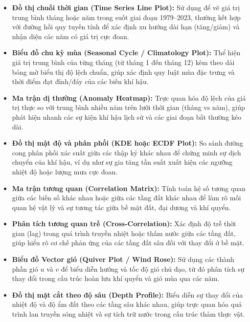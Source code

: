 \documentclass[12pt,a4paper]{article}
\begin{document}
\begin{itemize}
    \item \textbf{Đồ thị chuỗi thời gian (Time Series Line Plot):} Sử dụng để vẽ giá trị trung bình tháng hoặc năm trong suốt giai đoạn 1979–2023, thường kết hợp với đường hồi quy tuyến tính để xác định xu hướng dài hạn (tăng/giảm) và nhận diện các năm có giá trị cực đoan.
    \item \textbf{Biểu đồ chu kỳ mùa (Seasonal Cycle / Climatology Plot):} Thể hiện giá trị trung bình của từng tháng (từ tháng 1 đến tháng 12) kèm theo dải bóng mờ biểu thị độ lệch chuẩn, giúp xác định quy luật mùa đặc trưng và thời điểm đạt đỉnh/đáy của các biến khí hậu.
    \item \textbf{Ma trận dị thường (Anomaly Heatmap):} Trực quan hóa độ lệch của giá trị thực so với trung bình nhiều năm trên lưới thời gian (tháng vs năm), giúp phát hiện nhanh các sự kiện khí hậu lịch sử và các giai đoạn bất thường kéo dài.
    \item \textbf{Đồ thị mật độ và phân phối (KDE hoặc ECDF Plot):} So sánh đường cong phân phối xác suất giữa các thập kỷ khác nhau để chứng minh sự dịch chuyển của khí hậu, ví dụ như sự gia tăng tần suất xuất hiện các ngưỡng nhiệt độ hoặc lượng mưa cực đoan.
    \item \textbf{Ma trận tương quan (Correlation Matrix):} Tính toán hệ số tương quan giữa các biến số khác nhau hoặc giữa các tầng đất khác nhau để làm rõ mối quan hệ vật lý và sự tương tác giữa bề mặt đất, đại dương và khí quyển.
    \item \textbf{Phân tích tương quan trễ (Cross-Correlation):} Xác định độ trễ thời gian (lag) trong quá trình truyền nhiệt hoặc thấm nước giữa các tầng đất, giúp hiểu rõ cơ chế phản ứng của các tầng đất sâu đối với thay đổi ở bề mặt.
    \item \textbf{Biểu đồ Vector gió (Quiver Plot / Wind Rose):} Sử dụng các thành phần gió $u$ và $v$ để biểu diễn hướng và tốc độ gió chủ đạo, từ đó phân tích sự thay đổi trong cấu trúc hoàn lưu khí quyển và gió mùa qua các năm.
    \item \textbf{Đồ thị mặt cắt theo độ sâu (Depth Profile):} Biểu diễn sự thay đổi của nhiệt độ và độ ẩm đất theo các tầng sâu khác nhau, giúp trực quan hóa quá trình lan truyền sóng nhiệt và sự tích trữ nước trong cấu trúc thảm thực vật.
\end{itemize}

\newpage
\newpage
\end{document}
